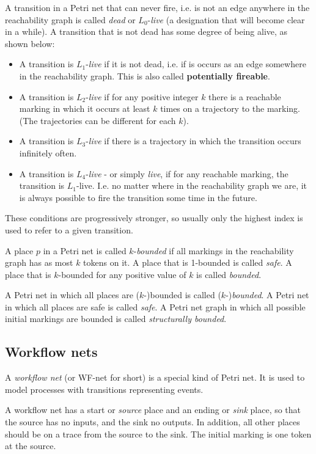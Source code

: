 \documentclass[12pt, a4paper]{article}
\numberwithin{equation}{section}
\begin{document}
A transition in a Petri net that can never fire, i.e. is not an edge anywhere in the reachability graph is called \textit{dead} or $L_0$-\textit{live} (a designation that will become clear in a while). A transition that is not dead has some degree of being alive, as shown below:
\begin{itemize}
\item A transition is $L_1$-\textit{live} if it is not dead, i.e. if is occurs as an edge somewhere in the reachability graph. This is also called \textbf{potentially fireable}.
\item  A transition is $L_2$-\textit{live} if for any positive integer $k$ there is a reachable marking in which it occurs at least $k$ times on a trajectory to the marking. (The trajectories can be different for each $k$).
\item  A transition is $L_3$-\textit{live} if there is a trajectory in which the transition occurs infinitely often.
\item  A transition is $L_4$-\textit{live} - or simply \textit{live}, if for any reachable marking, the transition is $L_1$-live. I.e. no matter where in the reachability graph we are, it is always possible to fire the transition some time in the future.
\end{itemize}
These conditions are progressively stronger, so usually only the highest index is used to refer to a given transition.

A place $p$ in a Petri net is called $k$-\textit{bounded} if all markings in the reachability graph has as most $k$ tokens on it. A place that is 1-bounded is called \textit{safe}. A place that is $k$-bounded for any positive value of $k$ is called \textit{bounded}.

A Petri net in which all places are ($k$-)bounded is called  ($k$-)\textit{bounded}. A Petri net in which all places are safe is called \textit{safe}. A Petri net graph in which all possible initial markings are bounded is called \textit{structurally bounded}.

\subsection{Workflow nets}
A \textit{workflow net} (or WF-net for short) is a special kind of Petri net. It is used to model processes with transitions representing events.

A workflow net has a start or \textit{source} place and an ending or \textit{sink} place, so that the source has no inputs, and the sink no outputs. In addition, all other places should be on a trace from the source to the sink. The initial marking is one token at the source.
\end{document}
